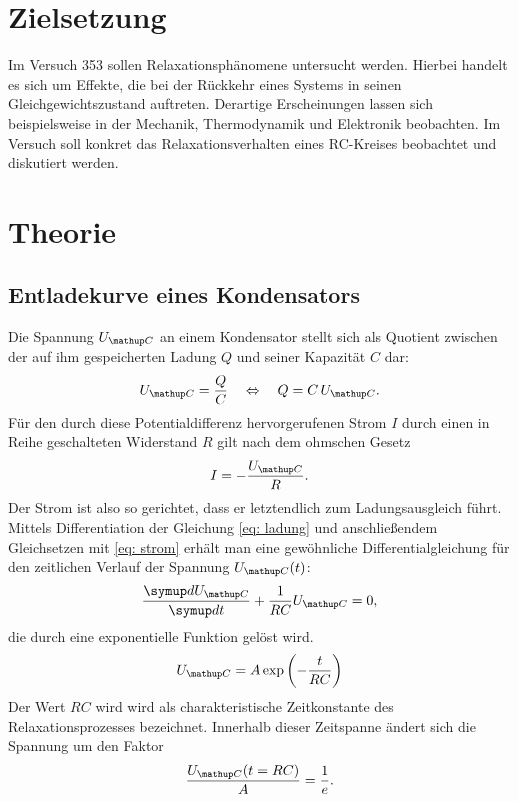 \setcounter{page}{1}
\section*{Zielsetzung}
Im Versuch 353 sollen Relaxationsphänomene untersucht werden. Hierbei handelt es sich um Effekte, die bei der Rückkehr eines
Systems in seinen Gleichgewichtszustand auftreten. Derartige Erscheinungen lassen sich beispielsweise in der Mechanik, Thermodynamik
und Elektronik beobachten. Im Versuch soll konkret das Relaxationsverhalten eines RC-Kreises beobachtet und diskutiert werden.
\section{Theorie}
\subsection{Entladekurve eines Kondensators}
Die Spannung $U\ua{C}$ an einem Kondensator stellt sich als Quotient zwischen der auf ihm gespeicherten Ladung $Q$ und seiner Kapazität $C$ dar:
\begin{equation}
  U\ua{C} = \frac{Q}{C} \quad \Leftrightarrow \quad Q = C\, U\ua{C}.
  \label{eq: ladung}
\end{equation}
Für den durch diese Potentialdifferenz hervorgerufenen Strom $I$ durch einen in Reihe geschalteten Widerstand $R$ gilt nach dem ohmschen Gesetz
\begin{equation}
  I = -\frac{U\ua{C}}{R}.
  \label{eq: strom}
\end{equation}
Der Strom ist also so gerichtet, dass er letztendlich zum Ladungsausgleich führt. Mittels Differentiation der Gleichung \eqref{eq: ladung} und anschließendem
Gleichsetzen mit \eqref{eq: strom} erhält
man eine gewöhnliche Differentialgleichung für den zeitlichen Verlauf der Spannung $U\ua{C}(t)$:
\begin{equation}
  \frac{\dif{U\ua{C}}}{\dif{t}} + \frac{1}{RC}U\ua{C} = 0,
\end{equation}
die durch eine exponentielle Funktion gelöst wird.
\begin{equation}
  \label{eq:entlade_kurve}
  U\ua{C} = A \exp\left(-\frac{t}{RC}\right)
\end{equation}
Der Wert $RC$ wird wird als charakteristische Zeitkonstante des Relaxationsprozesses bezeichnet. Innerhalb dieser Zeitspanne ändert %
sich die Spannung um den Faktor
\begin{equation}
  \frac{U\ua{C}(t = RC)}{A} = \frac{1}{e}.
\end{equation}
